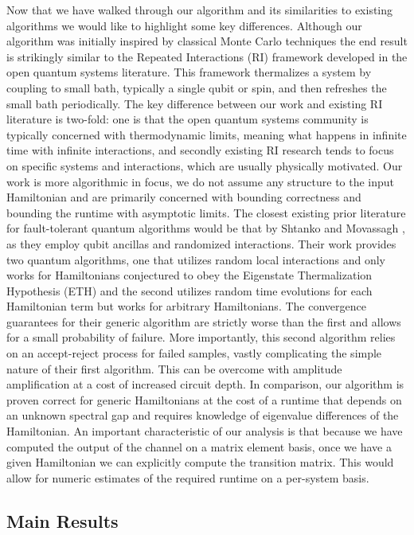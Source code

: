\documentclass{article}
\begin{document}
Now that we have walked through our algorithm and its similarities to existing algorithms we would like to highlight some key differences. Although our algorithm was initially inspired by classical Monte Carlo techniques the end result is strikingly similar to the Repeated Interactions (RI) framework developed in the open quantum systems literature. This framework thermalizes a system by coupling to small bath, typically a single qubit or spin, and then refreshes the small bath periodically. The key difference between our work and existing RI literature is two-fold: one is that the open quantum systems community is typically concerned with thermodynamic limits, meaning what happens in infinite time with infinite interactions, and secondly existing RI research tends to focus on specific systems and interactions, which are usually physically motivated. Our work is more algorithmic in focus, we do not assume any structure to the input Hamiltonian and are primarily concerned with bounding correctness and bounding the runtime with asymptotic limits. The closest existing prior literature for fault-tolerant quantum algorithms would be that by Shtanko and Movassagh \cite{shtanko2023preparingthermalstatesnoiseless}, as they employ qubit ancillas and randomized interactions. Their work provides two quantum algorithms, one that utilizes random local interactions and only works for Hamiltonians conjectured to obey the Eigenstate Thermalization Hypothesis (ETH) and the second utilizes random time evolutions for each Hamiltonian term but works for arbitrary Hamiltonians. The convergence guarantees for their generic algorithm are strictly worse than the first and allows for a small probability of failure. More importantly, this second algorithm relies on an accept-reject process for failed samples, vastly complicating the simple nature of their first algorithm. This can be overcome with amplitude amplification at a cost of increased circuit depth. In comparison, our algorithm is proven correct for generic Hamiltonians at the cost of a runtime that depends on an unknown spectral gap and requires knowledge of eigenvalue differences of the Hamiltonian. An important characteristic of our analysis is that because we have computed the output of the channel on a matrix element basis, once we have a given Hamiltonian we can explicitly compute the transition matrix. This would allow for numeric estimates of the required runtime on a per-system basis. 

\subsection{Main Results}
\end{document}
